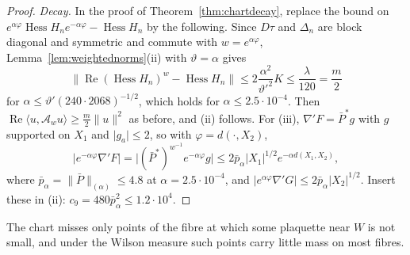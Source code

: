 \documentclass[11pt]{amsart}
\theoremstyle{definition}
\theoremstyle{remark}
\numberwithin{equation}{section}
\begin{document}
\begin{proof}
\emph{Decay.} In the proof of Theorem~\ref{thm:chartdecay}, replace the
bound on $e^{\alpha\varphi}\operatorname{Hess}H_ne^{-\alpha\varphi}-
\operatorname{Hess}H_n$ by the following. Since $D\tau$ and $\Delta_n$ are
block diagonal and symmetric and commute with $w=e^{\alpha\varphi}$,
Lemma~\ref{lem:weightednorms}(ii) with $\vartheta=\alpha$ gives
\[
\bigl\lVert\operatorname{Re}(\operatorname{Hess}H_n)^w-\operatorname{Hess}H
_n\bigr\rVert\le2\frac{\alpha^2}{\vartheta'^2}K\le\frac\lambda{120}=\frac m2
\]
for $\alpha\le\vartheta'(240\cdot2068)^{-1/2}$, which holds for $\alpha\le
2.5\cdot10^{-4}$. Then $\operatorname{Re}\langle u,\mathcal A_wu\rangle\ge
\frac m2\lVert u\rVert^2$ as before, and (ii) follows. For (iii), $\nabla'F
=\bar P^*g$ with $g$ supported on $X_1$ and $\lvert g_a\rvert\le2$, so with
$\varphi=d(\cdot,X_2)$,
\[
\lvert e^{-\alpha\varphi}\nabla'F\rvert=\lvert(\bar P^*)^{w^{-1}}e^{-\alpha
\varphi}g\rvert\le2\bar p_\alpha\lvert X_1\rvert^{1/2}e^{-\alpha d(X_1,X_2)},
\]
where $\bar p_\alpha=\lVert\bar P\rVert_{(\alpha)}\le4.8$ at $\alpha=2.5\cdot
10^{-4}$, and $\lvert e^{\alpha\varphi}\nabla'G\rvert\le2\bar p_\alpha\lvert
X_2\rvert^{1/2}$. Insert these in (ii): $c_9=480\bar p_\alpha^2\le1.2\cdot
10^4$.
\end{proof}

The chart misses only points of the fibre at which some plaquette near $W$
is not small, and under the Wilson measure such points carry little mass on
most fibres.
\end{document}

